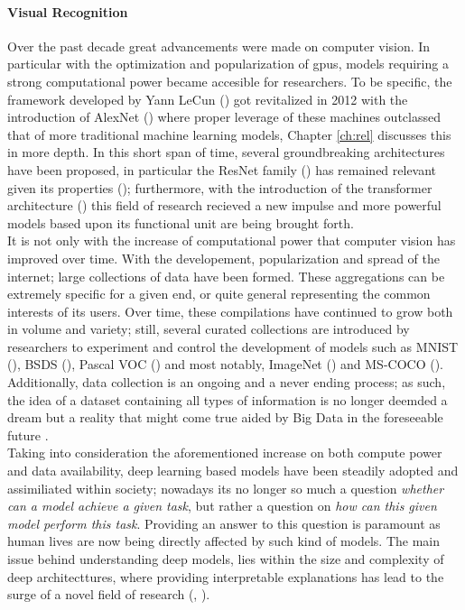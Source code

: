 

\paragraph{Visual Recognition}  Over the past decade great advancements were made on computer 
vision. In particular with the optimization and popularization of \glspl{gpu}, models requiring 
a strong computational power became accesible for researchers. To be specific, the framework 
developed by Yann LeCun (\cite{lecun1998gradient}) got revitalized in 2012 with the introduction of 
AlexNet (\cite{krizhevsky2012imagenet}) where proper leverage of these machines outclassed that of 
more traditional machine learning models, Chapter \ref{ch:rel} discusses this in more depth. 
In this short span of time, several groundbreaking architectures have been proposed, in 
particular the ResNet family (\cite{he2016deep}) has remained relevant given its properties
(\cite{wightman2021resnet}); furthermore, with the introduction of the transformer architecture 
(\cite{vaswani2017attention}) this field of research recieved a new impulse and more powerful 
models based upon its functional unit are being brought forth.\\

\noindent It is not only with the increase of computational power that computer vision has improved over time. 
With the developement, popularization and spread of the internet; large collections of data have been 
formed. These aggregations can be extremely specific for a given end, or 
quite general representing the common interests of its users. Over time, these compilations have 
continued to grow both in volume and variety; still, several curated collections are introduced by 
researchers to experiment and control the development of models such as MNIST (\cite{lecun1998gradient}),
BSDS (\cite{MartinFTM01}), Pascal VOC (\cite{pascal-voc-2012}) and most notably, 
ImageNet (\cite{ILSVRC15}) and MS-COCO (\cite{lin2014microsoft}). Additionally, data collection is
an ongoing and a never ending process; as such, the idea of a dataset containing all types of 
information is no longer deemded a dream but a reality that might come true aided by Big Data in 
the foreseeable future \autocite{chen2014big}.\\

\noindent Taking into consideration the aforementioned  increase on  both compute power and data 
availability, deep learning based models have been steadily adopted and assimiliated within society; 
nowadays its no longer so much a question \textit{whether can a model achieve a given task}, but 
rather a question on \textit{how can this given model perform this task}. Providing an answer to 
this question is paramount as human lives are now being directly affected by such kind of models. 
The main issue behind understanding deep models, lies within the size and complexity of deep 
architecttures, where providing interpretable explanations has lead to the surge of a novel field 
of research (\cite{guidotti2018survey}, \cite{bodria2021benchmarking}).

